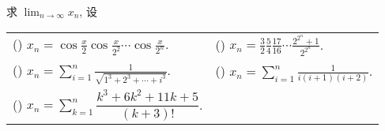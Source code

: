 \begin{example}
    求 $\displaystyle\lim_{n\to\infty}x_n$, 设
    \setcounter{magicrownumbers}{0}
    \begin{table}[H]
        \centering
        \begin{tabular}{l | l}
            (\rownumber{}) $\displaystyle x_n=\cos\frac{x}{2}\cos\frac{x}{2^2}\cdots\cos\frac{x}{2^n}$. & (\rownumber{}) $\displaystyle x_n=\frac{3}{2}\frac{5}{4}\frac{17}{16}\cdots\frac{2^{2^n}+1}{2^{2^n}}$. \\
            (\rownumber{}) $\displaystyle x_n=\sum_{i=1}^n\frac{1}{\sqrt{1^3+2^3+\cdots+i^3}}$.         & (\rownumber{}) $\displaystyle x_n=\sum_{i=1}^n\frac{1}{i(i+1)(i+2)}$. \\ 
            (\rownumber{}) $\displaystyle x_n=\sum_{k=1}^{n} \dfrac{k^3+6k^2+11k+5}{(k+3)!}$.
        \end{tabular}
    \end{table}
\end{example}
